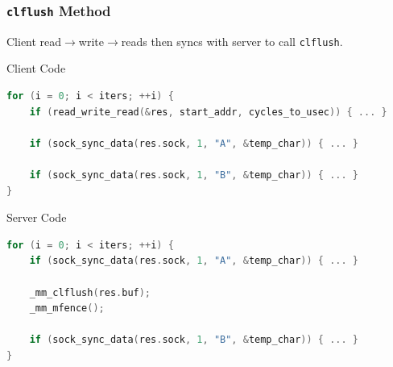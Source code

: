\documentclass{beamer}
\begin{document}
\begin{frame}[t,fragile]
 \frametitle{\texttt{clflush} Method}
 Client read$\rightarrow$write$\rightarrow$reads then syncs with server to call \texttt{clflush}.

 \begin{block}{Client Code}

  \begin{lstlisting}[frame=single, language=C, basicstyle=\tiny]
for (i = 0; i < iters; ++i) {
    if (read_write_read(&res, start_addr, cycles_to_usec)) { ... }

    if (sock_sync_data(res.sock, 1, "A", &temp_char)) { ... }

    if (sock_sync_data(res.sock, 1, "B", &temp_char)) { ... }
}
 \end{lstlisting}
 \end{block}

 \begin{block}{Server Code}
  \begin{lstlisting}[frame=single, language=C, basicstyle=\tiny]
for (i = 0; i < iters; ++i) {
    if (sock_sync_data(res.sock, 1, "A", &temp_char)) { ... }

    _mm_clflush(res.buf);
    _mm_mfence();

    if (sock_sync_data(res.sock, 1, "B", &temp_char)) { ... }
}
 \end{lstlisting}
 \end{block}

\end{frame}
\end{document}
